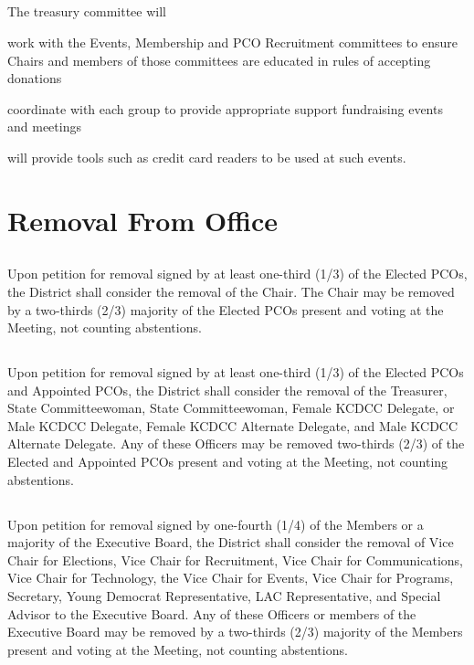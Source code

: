 \subsection{}
The treasury committee will
\begin{inlinealphalist}
    \item work with the Events, Membership and PCO Recruitment committees to ensure Chairs and members of those committees are educated in rules of accepting donations
    \item coordinate with each group to provide appropriate support fundraising events and meetings
    \item will provide tools such as credit card readers to be used at such events.
\end{inlinealphalist}

\section{Removal From Office}
\subsection{}
Upon petition for removal signed by at least one-third (1/3) of the Elected PCOs, the \fortythird{} District shall consider the removal of the Chair. The Chair may be removed by a two-thirds (2/3) majority of the Elected PCOs present and voting at the Meeting, not counting abstentions.

\subsection{}
Upon petition for removal signed by at least one-third (1/3) of the Elected PCOs and Appointed PCOs, the \fortythird{} District shall consider the removal of the Treasurer, State Committeewoman, State Committeewoman, Female KCDCC Delegate, or Male KCDCC Delegate, Female KCDCC Alternate Delegate, and Male KCDCC Alternate Delegate. Any of these Officers may be removed two-thirds (2/3) of the Elected and Appointed PCOs present and voting at the Meeting, not counting abstentions.

\subsection{} \label{eb-removal}
Upon petition for removal signed by one-fourth (1/4) of the Members or a majority of the Executive Board, the \fortythird{} District shall consider the removal of Vice Chair for Elections, Vice Chair for Recruitment, Vice Chair for Communications, Vice Chair for Technology, the Vice Chair for Events, Vice Chair for Programs, Secretary, Young Democrat Representative, LAC Representative, and Special Advisor to the Executive Board. Any of these Officers or members of the Executive Board may be removed by a two-thirds (2/3) majority of the Members present and voting at the Meeting, not counting abstentions.

